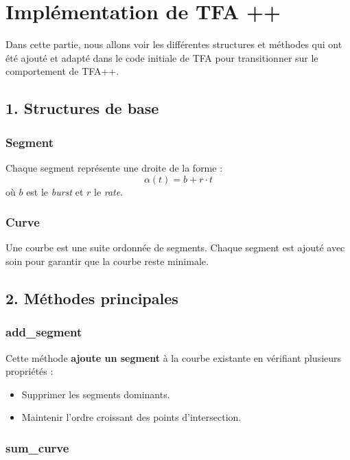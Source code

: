\documentclass[12pt]{report}
\begin{document}
\break{}

\section{Implémentation de TFA ++}

Dans cette partie, nous allons voir les différentes structures
et méthodes qui ont été ajouté et adapté dans le code initiale
de TFA pour transitionner sur le comportement de TFA++.

\subsection*{1. Structures de base}

\subsubsection*{Segment}

Chaque segment représente une droite de la forme :
\[
\alpha(t) = b + r \cdot t
\]
où $b$ est le \textit{burst} et $r$ le \textit{rate}.

\subsubsection*{Curve}

Une courbe est une suite ordonnée de segments.
Chaque segment est ajouté avec soin pour garantir que la courbe 
reste minimale.

\subsection*{2. Méthodes principales}

\subsubsection*{add\_segment}

Cette méthode \textbf{ajoute un segment} à la courbe existante en vérifiant plusieurs propriétés :

\begin{itemize}
  \item Supprimer les segments dominants.
  \item Maintenir l'ordre croissant des points d'intersection.
\end{itemize}

\subsubsection*{sum\_curve}
\end{document}
